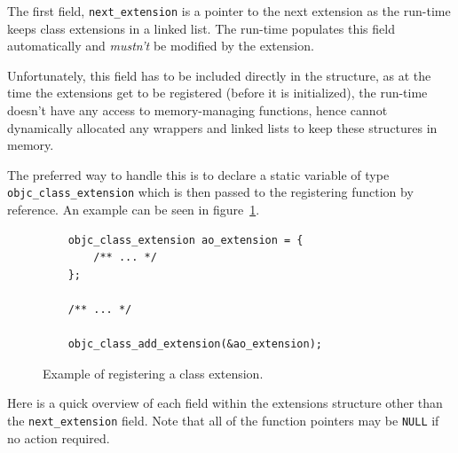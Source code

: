 The first field, \verb=next_extension= is a pointer to the next extension as the run-time keeps class extensions in a linked list. The run-time populates this field automatically and \emph{mustn't} be modified by the extension. 

Unfortunately, this field has to be included directly in the structure, as at the time the extensions get to be registered (before it is initialized), the run-time doesn't have any access to memory-managing functions, hence cannot dynamically allocated any wrappers and linked lists to keep these structures in memory.

The preferred way to handle this is to declare a static variable of type \newline{}\verb=objc_class_extension= which is then passed to the registering function by reference. An example can be seen in figure~\ref{fig:class_ext_struct_example}.

\begin{figure}[H] 
  \begin{verbatim}
    objc_class_extension ao_extension = { 
        /** ... */ 
    };
    
    /** ... */
    
    objc_class_add_extension(&ao_extension);
  \end{verbatim}
  \centering{}
  \caption{Example of registering a class extension.}
  \label{fig:class_ext_struct_example}
\end{figure}


Here is a quick overview of each field within the extensions structure other than the \verb=next_extension= field. Note that all of the function pointers may be \texttt{NULL} if no action required.

